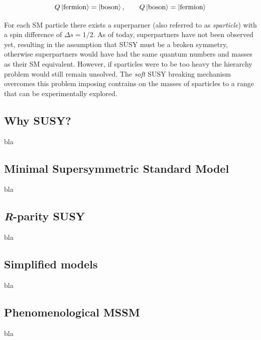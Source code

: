 		\begin{equation}
		\label{eq:susy_transformation}
			Q \ket{\mathrm{fermion}} = \ket{\mathrm{boson}}, \qquad Q \ket{\mathrm{boson}} = \ket{\mathrm{fermion}}
		\end{equation}

		\noindent For each SM particle there exists a superparner (also referred to as \emph{sparticle}) with a spin difference of $\Delta s = 1/2$. As of today, superpartners have not been observed yet, resulting in the assumption that SUSY must be a broken symmetry, otherwise superpartners would have had the same quantum numbers and masses as their SM equivalent. However, if sparticles were to be too heavy the hierarchy problem would still remain unsolved. The \emph{soft} SUSY breaking mechanism overcomes this problem imposing contrains on the masses of sparticles to a range that can be experimentally explored.

		\subsection{Why SUSY?}
			
			bla

		\subsection{Minimal Supersymmetric Standard Model}
			
			bla

		\subsection{\emph{R}-parity SUSY}
		
			bla

		\subsection{Simplified models}
		
			bla


		\subsection{Phenomenological MSSM}
		
			bla

